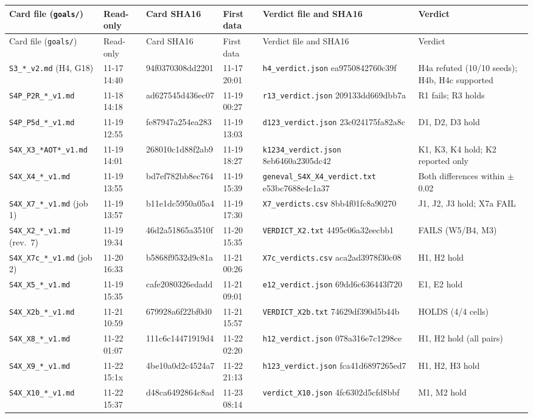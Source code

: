 \documentclass[conference]{IEEEtran}
\begin{document}
{\scriptsize
\setlength{\tabcolsep}{2pt}
\begin{longtable}{@{}P{3.5cm}P{1.6cm}P{2.4cm}P{1.6cm}P{4.2cm}P{3.5cm}@{}}
\toprule
Card file (\texttt{goals/}) & Read-only & Card SHA16 & First data & Verdict file and SHA16 & Verdict\\
\midrule
\endfirsthead
\toprule
Card file (\texttt{goals/}) & Read-only & Card SHA16 & First data & Verdict file and SHA16 & Verdict\\
\midrule
\endhead
\bottomrule
\endfoot
\texttt{S3\_*\_v2.md} (H4, G18) & 11-17 14:40 & 94f0370308dd2201 & 11-17 20:01 & \texttt{h4\_verdict.json} ea9750842760c39f & H4a refuted (10/10 seeds); H4b, H4c supported\\
\texttt{S4P\_P2R\_*\_v1.md} & 11-18 14:18 & ad627545d436ec07 & 11-19 00:27 & \texttt{r13\_verdict.json} 209133dd669dbb7a & R1 fails; R3 holds\\
\texttt{S4P\_P5d\_*\_v1.md} & 11-19 12:55 & fe87947a254ea283 & 11-19 13:03 & \texttt{d123\_verdict.json} 23c024175fa82a8c & D1, D2, D3 hold\\
\texttt{S4X\_X3\_*AOT*\_v1.md} & 11-19 14:01 & 268010c1d88f2ab9 & 11-19 18:27 & \texttt{k1234\_verdict.json} 8eb6460a2305dc42 & K1, K3, K4 hold; K2 reported only\\
\texttt{S4X\_X4\_*\_v1.md} & 11-19 13:55 & bd7ef782bb8ec764 & 11-19 15:39 & \texttt{geneval\_S4X\_X4\_verdict.txt} e53bc7688e4c1a37 & Both differences within $\pm$0.02\\
\texttt{S4X\_X7\_*\_v1.md} (job 1) & 11-19 13:57 & b11e1dc5950a05a4 & 11-19 17:30 & \texttt{X7\_verdicts.csv} 8bb4f01fc8a90270 & J1, J2, J3 hold; X7a FAIL\\
\texttt{S4X\_X2\_*\_v1.md} (rev.~7) & 11-19 19:34 & 46d2a51865a3510f & 11-20 15:35 & \texttt{VERDICT\_X2.txt} 4495c06a32eecbb1 & FAILS (W5/B4, M3)\\
\texttt{S4X\_X7c\_*\_v1.md} (job 2) & 11-20 16:33 & b5868f9532d9c81a & 11-21 00:26 & \texttt{X7c\_verdicts.csv} aca2ad3978f30c08 & H1, H2 hold\\
\texttt{S4X\_X5\_*\_v1.md} & 11-19 15:35 & cafe2080326edadd & 11-21 09:01 & \texttt{e12\_verdict.json} 69dd6c636443f720 & E1, E2 hold\\
\texttt{S4X\_X2b\_*\_v1.md} & 11-21 10:59 & 679928a6f22bf0d0 & 11-21 15:57 & \texttt{VERDICT\_X2b.txt} 74629df390d5b44b & HOLDS (4/4 cells)\\
\texttt{S4X\_X8\_*\_v1.md} & 11-22 01:07 & 111c6c14471919d4 & 11-22 02:20 & \texttt{h12\_verdict.json} 078a316e7c1298ce & H1, H2 hold (all pairs)\\
\texttt{S4X\_X9\_*\_v1.md} & 11-22 15:1x & 4be10a0d2c4524a7 & 11-22 21:13 & \texttt{h123\_verdict.json} fca41d6897265ed7 & H1, H2, H3 hold\\
\texttt{S4X\_X10\_*\_v1.md} & 11-22 15:37 & d48ca6492864c8ad & 11-23 08:14 & \texttt{verdict\_X10.json} 4fc6302d5cfd8bbf & M1, M2 hold\\
\end{longtable}
}
\end{document}
